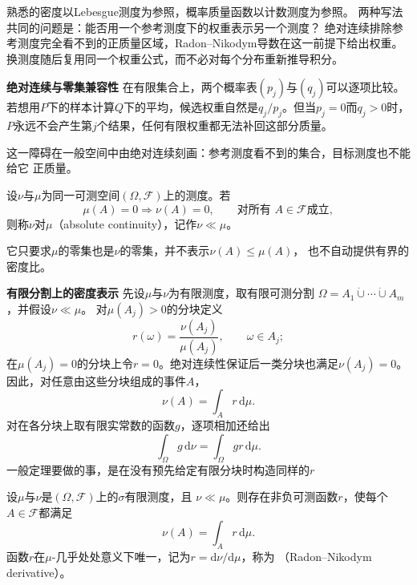 熟悉的密度以Lebesgue测度为参照，概率质量函数以计数测度为参照。
两种写法共同的问题是：能否用一个参考测度下的权重表示另一个测度？
绝对连续排除参考测度完全看不到的正质量区域，Radon--Nikodym导数在这一前提下给出权重。
换测度随后复用同一个权重公式，而不必对每个分布重新推导积分。

\par\medskip\noindent\textbf{绝对连续与零集兼容性}\quad
在有限集合上，两个概率表\((p_j)\)与\((q_j)\)可以逐项比较。若想用\(P\)下的样本计算\(Q\)下的平均，候选权重自然是\(q_j/p_j\)。但当\(p_j=0\)而\(q_j>0\)时，
\(P\)永远不会产生第\(j\)个结果，任何有限权重都无法补回这部分质量。

这一障碍在一般空间中由绝对连续刻画：参考测度看不到的集合，目标测度也不能给它
正质量。
\begin{definition}[测度的绝对连续]
\label{def:probability-absolute-continuity}
设\(\nu\)与\(\mu\)为同一可测空间\((\Omega,\mathcal{F})\)上的测度。若
\[ \mu(A)=0\Longrightarrow\nu(A)=0,
  \qquad\text{对所有 }A\in\mathcal{F}\text{成立}, \]
则称\(\nu\)对\(\mu\)（absolute continuity），记作\(\nu\ll\mu\)。
\end{definition}
它只要求\(\mu\)的零集也是\(\nu\)的零集，并不表示\(\nu(A)\leq\mu(A)\)，
也不自动提供有界的密度比。

\par\medskip\noindent\textbf{有限分割上的密度表示}\quad
先设\(\mu\)与\(\nu\)为有限测度，取有限可测分割
\(\Omega=A_1\mathbin{\dot\cup}\cdots\mathbin{\dot\cup}A_m\)，并假设\(\nu\ll\mu\)。
对\(\mu(A_j)>0\)的分块定义
\[ r(\omega)=\frac{\nu(A_j)}{\mu(A_j)},
  \qquad \omega\in A_j; \]
在\(\mu(A_j)=0\)的分块上令\(r=0\)。绝对连续性保证后一类分块也满足\(\nu(A_j)=0\)。因此，对任意由这些分块组成的事件\(A\)，
\[ \nu(A)=\int_A r\,\mathrm{d}\mu. \]
对在各分块上取有限实常数的函数\(g\)，逐项相加还给出
\begin{equation}
  \int_{\Omega}g\,\mathrm{d}\nu
  =
  \int_{\Omega}gr\,\mathrm{d}\mu.
  \label{eq:probability-finite-change-measure}
\end{equation}
一般定理要做的事，是在没有预先给定有限分块时构造同样的\(r\)

\begin{theorem}
\label{thm:probability-radon-nikodym}
设\(\mu\)与\(\nu\)是\((\Omega,\mathcal{F})\)上的\(\sigma\)有限测度，且
\(\nu\ll\mu\)。则存在非负可测函数\(r\)，使每个\(A\in\mathcal{F}\)都满足
\begin{equation}
  \nu(A)=\int_A r\,\mathrm{d}\mu.
  \label{eq:probability-rn-representation}
\end{equation}
函数\(r\)在\(\mu\)-几乎处处意义下唯一，记为\(r=\mathrm{d}\nu/\mathrm{d}\mu\)，称为
（Radon--Nikodym derivative）。
\end{theorem}

